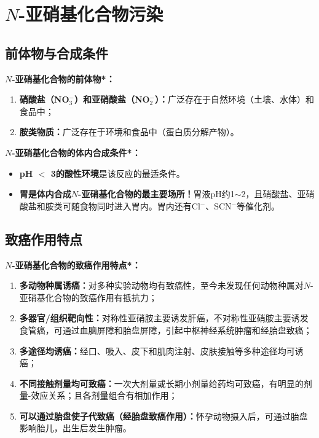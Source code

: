 \section{$N$-亚硝基化合物污染}

\subsection{前体物与合成条件}

\begin{keybox}
\textbf{$N$-亚硝基化合物的前体物*：}
\begin{enumerate}[leftmargin=*]
    \item \textbf{硝酸盐（NO$_3^-$）和亚硝酸盐（NO$_2^-$）：}广泛存在于自然环境（土壤、水体）和食品中；
    \item \textbf{胺类物质：}广泛存在于环境和食品中（蛋白质分解产物）。
\end{enumerate}

\textbf{$N$-亚硝基化合物的体内合成条件*：}
\begin{itemize}[leftmargin=*]
    \item \textbf{pH $<$ 3的酸性环境}是该反应的最适条件。
    \item \textbf{胃是体内合成$N$-亚硝基化合物的最主要场所！}胃液pH约1$\sim$2，且硝酸盐、亚硝酸盐和胺类可随食物同时进入胃内。胃内还有Cl$^-$、SCN$^-$等催化剂。
\end{itemize}
\end{keybox}

\subsection{致癌作用特点}

\begin{keybox}
\textbf{$N$-亚硝基化合物的致癌作用特点*：}
\begin{enumerate}[leftmargin=*]
    \item \textbf{多动物种属诱癌：}对多种实验动物均有致癌性，至今未发现任何动物种属对$N$-亚硝基化合物的致癌作用有抵抗力；
    \item \textbf{多器官/组织靶向性：}对称性亚硝胺主要诱发肝癌，不对称性亚硝胺主要诱发食管癌，可通过血脑屏障和胎盘屏障，引起中枢神经系统肿瘤和经胎盘致癌；
    \item \textbf{多途径均诱癌：}经口、吸入、皮下和肌肉注射、皮肤接触等多种途径均可诱癌；
    \item \textbf{不同接触剂量均可致癌：}一次大剂量或长期小剂量给药均可致癌，有明显的剂量-效应关系；且各剂量组合有相加作用；
    \item \textbf{可以通过胎盘使子代致癌（经胎盘致癌作用）：}怀孕动物摄入后，可通过胎盘影响胎儿，出生后发生肿瘤。
\end{enumerate}
\end{keybox}

